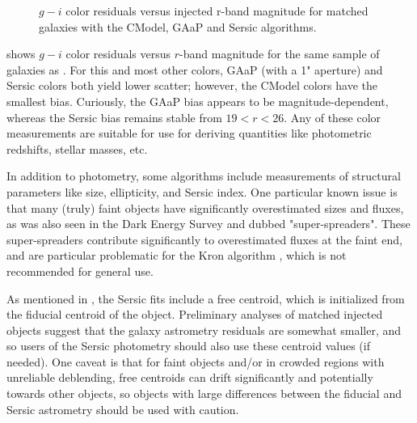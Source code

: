 \begin{figure}[htb]
\caption{$g-i$ color residuals versus injected r-band magnitude for matched galaxies with the CModel, GAaP and Sersic algorithms.}
\label{fig:injected_lsst_cells_v1_5063_r_color_g_minus_i}
\vspace{0.1cm}
\end{figure}

 shows $g-i$ color residuals versus $r$-band magnitude for the same sample of galaxies as .
For this and most other colors, GAaP (with a 1" aperture) and Sersic colors both yield lower scatter; however, the CModel colors have the smallest bias.
Curiously, the GAaP bias appears to be magnitude-dependent, whereas the Sersic bias remains stable from $19<r<26$.
Any of these color measurements are suitable for use for deriving quantities like photometric redshifts, stellar masses, etc.

In addition to photometry, some algorithms include measurements of structural parameters like size, ellipticity, and Sersic index.
One particular known issue is that many (truly) faint objects have significantly overestimated sizes and fluxes, as was also seen in the Dark Energy Survey \citep{2025arXiv250105739B} and dubbed "super-spreaders".
These super-spreaders contribute significantly to overestimated fluxes at the faint end, and are particular problematic for the Kron algorithm \citep{1980ApJS...43..305K}, which is not recommended for general use.

As mentioned in , the Sersic fits include a free centroid, which is initialized from the fiducial centroid of the object.
Preliminary analyses of matched injected objects suggest that the galaxy astrometry residuals are somewhat smaller, and so users of the Sersic photometry should also use these centroid values (if needed).
One caveat is that for faint objects and/or in crowded regions with unreliable deblending, free centroids can drift significantly and potentially towards other objects, so objects with large differences between the fiducial and Sersic astrometry should be used with caution.

